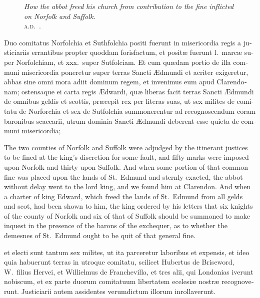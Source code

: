 \documentclass{book}
\newcommand{\blockhead}[4][]{
\begin{figure}
\centering
\vspace{#4}
\parbox{2.75cm}{\begin{center}\footnotesize \color{BrickRed} \emph{#2}\\ #1 \end{center}}
\end{figure}
}
\begin{document}
\begin{paracol}{2}
\switchcolumn*

\begin{otherlanguage}{latin}
\blockhead[\textsc{a.d}.\ .]{How the abbot freed his church from contribution to the fine inflicted on Norfolk and Suffolk.}{5}{-.6cm}
Duo comitatus Norfolchia et Suthfolchia positi fuerunt in misericordia regis a justiciariis errantibus propter quoddam forisfactum, et posit\ae{} fuerunt l.\ marc\ae{} super Norfolchiam, et xxx.\ super Sutfolciam. Et cum qu\ae{}dam portio de illa communi misericordia poneretur super terras Sancti \AE{}dmundi et acriter  exigeretur, abbas sine omni mora adiit dominum regem, et invenimus eum apud Clarendonam; ostensaque ei carta regis \AE{}dwardi, qu\ae{} liberas facit terras  Sancti \AE{}dmundi de omnibus geldis et scottis, pr\ae{}cepit rex per literas suas, ut sex milites de comitatu de Norforchia et sex de Sutfolchia summonerentur ad recognoscendum coram baronibus scaccarii, utrum dominia Sancti \AE{}dmundi deberent esse quieta de communi misericordia; 

\end{otherlanguage}

\switchcolumn

The two counties of Norfolk and Suffolk were adjudged by the itinerant justices to be fined at the king's discretion for some fault, and fifty marks were imposed upon Norfolk and thirty upon Suffolk. And when some portion of that common fine was placed upon the lands of St.\ Edmund and sternly exacted, the abbot without delay went to the lord king, and we found him at Clarendon. And when a charter of king Edward, which freed the lands of St.\ Edmund from all gelds and scot, had been shown to him, the king ordered by his letters that six knights of the county of Norfolk and six of that of Suffolk should be summoned to make inquest in the presence of the barons of the exchequer, as to whether the demesnes of St.\ Edmund ought to be quit of that general fine.

\switchcolumn*

\begin{otherlanguage}{latin}
et electi sunt tantum sex milites, ut ita parceretur laboribus et expensis, et ideo quia habuerunt terras in utroque comitatu, scilicet Hubertus de Briseword, W.\ filius Hervei, et Willielmus de Franchevilla, et tres alii, qui Londonias iverunt nobiscum, et ex parte duorum comitatuum libertatem ecelesi\ae{} nostr\ae{} recognoverunt. Justiciarii autem assidentes verumdictum illorum inrollaverunt.
\end{otherlanguage}


\end{paracol}
\end{document}
